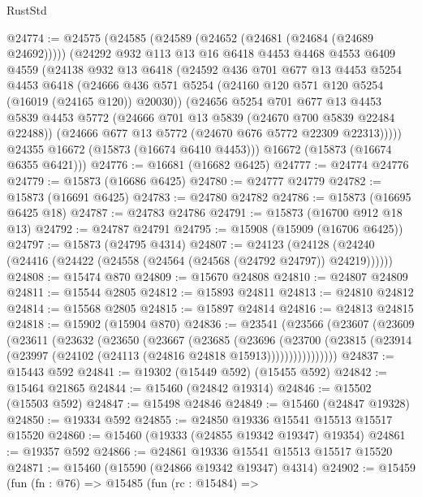 \begin{lexlean}{RustStd}
\begin{coremodule}
@24774 := @24575
    (@24585
      (@24589 (@24652 (@24681 (@24684 (@24689 @24692)))))
      (@24292
        @932
        @113
        @13
        @16
        @6418
        @4453
        @4468
        @4553
        @6409
        @4559
        (@24138
          @932
          @13
          @6418
          (@24592
            @436
            @701
            @677
            @13
            @4453
            @5254
            @4453
            @6418
            (@24666 @436 @571 @5254 (@24160 @120 @571 @120 @5254 (@16019 (@24165 @120)) @20030))
            (@24656
              @5254
              @701
              @677
              @13
              @4453
              @5839
              @4453
              @5772
              (@24666 @701 @13 @5839 (@24670 @700 @5839 @22484 @22488))
              (@24666 @677 @13 @5772 (@24670 @676 @5772 @22309 @22313)))))
        @24355
        @16672
        (@15873 (@16674 @6410 @4453)))
      @16672
      (@15873 (@16674 @6355 @6421)))
@24776 := @16681 (@16682 @6425)
@24777 := @24774 @24776
@24779 := @15873 (@16686 @6425)
@24780 := @24777 @24779
@24782 := @15873 (@16691 @6425)
@24783 := @24780 @24782
@24786 := @15873 (@16695 @6425 @18)
@24787 := @24783 @24786
@24791 := @15873 (@16700 @912 @18 @13)
@24792 := @24787 @24791
@24795 := @15908 (@15909 (@16706 @6425))
@24797 := @15873 (@24795 @4314)
@24807 := @24123
    (@24128 (@24240 (@24416 (@24422 (@24558 (@24564 (@24568 (@24792 @24797)) @24219))))))
@24808 := @15474 @870
@24809 := @15670 @24808
@24810 := @24807 @24809
@24811 := @15544 @2805
@24812 := @15893 @24811
@24813 := @24810 @24812
@24814 := @15568 @2805
@24815 := @15897 @24814
@24816 := @24813 @24815
@24818 := @15902 (@15904 @870)
@24836 := @23541
    (@23566
      (@23607
        (@23609
          (@23611
            (@23632
              (@23650
                (@23667
                  (@23685
                    (@23696
                      (@23700
                        (@23815
                          (@23914 (@23997 (@24102 (@24113 (@24816 @24818 @15913))))))))))))))))
@24837 := @15443 @592
@24841 := @19302 (@15449 @592) (@15455 @592)
@24842 := @15464 @21865
@24844 := @15460 (@24842 @19314)
@24846 := @15502 (@15503 @592)
@24847 := @15498 @24846
@24849 := @15460 (@24847 @19328)
@24850 := @19334 @592
@24855 := @24850 @19336 @15541 @15513 @15517 @15520
@24860 := @15460 (@19333 (@24855 @19342 @19347) @19354)
@24861 := @19357 @592
@24866 := @24861 @19336 @15541 @15513 @15517 @15520
@24871 := @15460 (@15590 (@24866 @19342 @19347) @4314)
@24902 := @15459
    (fun (fn : @76) =>
    @15485
      (fun (rc : @15484) =>

\end{coremodule}
\end{lexlean}
